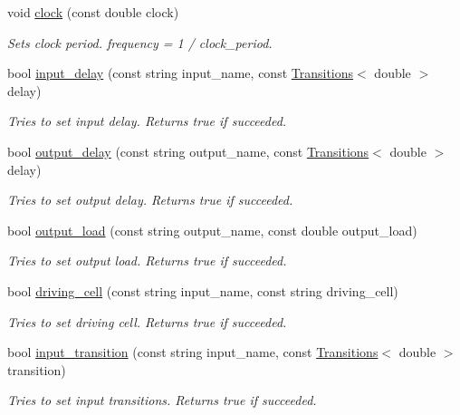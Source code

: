 \begin{DoxyCompactItemize}
\item 
void \hyperlink{classDesign__Constraints_a3d8381f421422cdaa12e78216a3b46a8}{clock} (const double clock)
\begin{DoxyCompactList}\small\item\em Sets clock period. frequency = 1 / clock\-\_\-period. \end{DoxyCompactList}\item 
bool \hyperlink{classDesign__Constraints_ab9e466f0f2ad7cfd16f8fe0d0b814b16}{input\-\_\-delay} (const string input\-\_\-name, const \hyperlink{classTransitions}{Transitions}$<$ double $>$ delay)
\begin{DoxyCompactList}\small\item\em Tries to set input delay. Returns true if succeeded. \end{DoxyCompactList}\item 
bool \hyperlink{classDesign__Constraints_a295b66d558e3aefea0b2d2629752517d}{output\-\_\-delay} (const string output\-\_\-name, const \hyperlink{classTransitions}{Transitions}$<$ double $>$ delay)
\begin{DoxyCompactList}\small\item\em Tries to set output delay. Returns true if succeeded. \end{DoxyCompactList}\item 
bool \hyperlink{classDesign__Constraints_a3a670a53112e18db745a6f3de9597cd3}{output\-\_\-load} (const string output\-\_\-name, const double output\-\_\-load)
\begin{DoxyCompactList}\small\item\em Tries to set output load. Returns true if succeeded. \end{DoxyCompactList}\item 
bool \hyperlink{classDesign__Constraints_a54c18f5ebd9dbcdc9d3ab8f2d363fc04}{driving\-\_\-cell} (const string input\-\_\-name, const string driving\-\_\-cell)
\begin{DoxyCompactList}\small\item\em Tries to set driving cell. Returns true if succeeded. \end{DoxyCompactList}\item 
bool \hyperlink{classDesign__Constraints_afd86c8844a5a62d1a6bbd7138d548cf9}{input\-\_\-transition} (const string input\-\_\-name, const \hyperlink{classTransitions}{Transitions}$<$ double $>$ transition)
\begin{DoxyCompactList}\small\item\em Tries to set input transitions. Returns true if succeeded. \end{DoxyCompactList}\item 

\end{DoxyCompactItemize}
